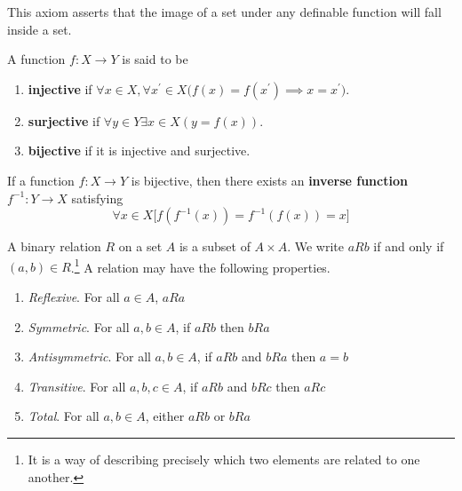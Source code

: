 \documentclass{article}
\begin{document}
    \begin{axiom}
      This axiom asserts that the image of a set under any definable function will fall inside a set. 
    \end{axiom} 

    \begin{definition}
      A function $f: X \rightarrow Y$ is said to be 
      \begin{enumerate}
        \item \textbf{injective} if $\forall x \in X, \forall x^\prime \in X \big( f(x) = f(x^\prime) \implies x = x^\prime \big)$. 
        \item \textbf{surjective} if $\forall y \in Y \exists x \in X (y = f(x))$. 
        \item \textbf{bijective} if it is injective and surjective. 
      \end{enumerate}
    \end{definition}

    \begin{definition}
      If a function $f: X \rightarrow Y$ is bijective, then there exists an \textbf{inverse function} $f^{-1}: Y \rightarrow X$ satisfying 
      \begin{equation}
        \forall x \in X \big[ f(f^{-1}(x)) = f^{-1} (f(x)) = x \big]
      \end{equation}
    \end{definition}

    \begin{definition}[Relation]
      A binary relation $R$ on a set $A$ is a subset of $A \times A$. We write $aRb$ if and only if $(a,b) \in R$.\footnote{It is a way of describing precisely which two elements are related to one another.} A relation may have the following properties. 
      \begin{enumerate}
        \item \textit{Reflexive}. For all $a \in A$, $aRa$
        \item \textit{Symmetric}. For all $a,b \in A$, if $aRb$ then $bRa$
        \item \textit{Antisymmetric}. For all $a,b \in A$, if $aRb$ and $bRa$ then $a=b$
        \item \textit{Transitive}. For all $a,b,c \in A$, if $aRb$ and $bRc$ then $aRc$
        \item \textit{Total}. For all $a,b \in A$, either $aRb$ or $bRa$
      \end{enumerate}
    \end{definition}
\end{document}
